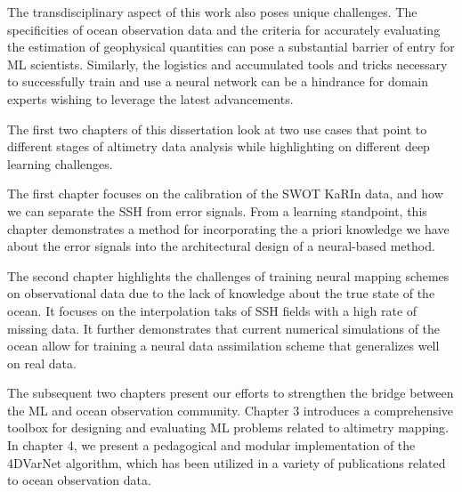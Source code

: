 \begin{bibunit}
  The transdisciplinary aspect of this work also poses unique challenges. The specificities of ocean observation data and the criteria for accurately evaluating the estimation of geophysical quantities can pose a substantial barrier of entry for ML scientists. Similarly, the logistics and accumulated tools and tricks necessary to successfully train and use a neural network can be a hindrance for domain experts wishing to leverage the latest advancements.

The first two chapters of this dissertation look at two use cases that point to different stages of altimetry data analysis while highlighting on different deep learning challenges.

The first chapter focuses on the calibration of the SWOT KaRIn data, and how we can separate the SSH from error signals. From a learning standpoint, this chapter demonstrates a method for incorporating the a priori knowledge we have about the error signals into the architectural design of a neural-based method.

The second chapter highlights the challenges of training neural mapping schemes on observational data due to the lack of knowledge about the true state of the ocean. It focuses on the interpolation taks of SSH fields with a high rate of missing data. It further demonstrates that current numerical simulations of the ocean allow for training a neural data assimilation scheme that generalizes well on real data.

The subsequent two chapters present our efforts to strengthen the bridge between the ML and ocean observation community. Chapter 3 introduces a comprehensive toolbox for designing and evaluating ML problems related to altimetry mapping. In chapter 4, we present a pedagogical and modular implementation of the 4DVarNet algorithm, which has been utilized in a variety of publications related to ocean observation data.




\end{bibunit}
